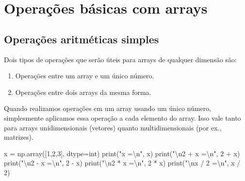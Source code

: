 \documentclass[
  brazilian,
  letterpaper,
  DIV=11,
  numbers=noendperiod]{scrreprt}
\newenvironment{Shaded}{\begin{snugshade}}{\end{snugshade}}
\newcommand{\BuiltInTok}[1]{\textcolor[rgb]{0.00,0.23,0.31}{#1}}
\newcommand{\CharTok}[1]{\textcolor[rgb]{0.13,0.47,0.30}{#1}}
\newcommand{\DecValTok}[1]{\textcolor[rgb]{0.68,0.00,0.00}{#1}}
\newcommand{\NormalTok}[1]{\textcolor[rgb]{0.00,0.23,0.31}{#1}}
\newcommand{\OperatorTok}[1]{\textcolor[rgb]{0.37,0.37,0.37}{#1}}
\newcommand{\StringTok}[1]{\textcolor[rgb]{0.13,0.47,0.30}{#1}}
\begin{document}
\section{Operações básicas com
arrays}\label{operauxe7uxf5es-buxe1sicas-com-arrays}

\subsection{Operações aritméticas
simples}\label{operauxe7uxf5es-aritmuxe9ticas-simples}

Dois tipos de operações que serão úteis para arrays de qualquer dimensão
são:

\begin{enumerate}
\def\labelenumi{\arabic{enumi}.}
\item
  Operações entre um array e um único número.
\item
  Operações entre dois arrays da mesma forma.
\end{enumerate}

Quando realizamos operações em um array usando um único número,
simplesmente aplicamos essa operação a cada elemento do array. Isso vale
tanto para arrays unidimensionais (vetores) quanto multidimensionais
(por ex., matrizes).

\begin{Shaded}
\begin{Highlighting}[]
\NormalTok{x }\OperatorTok{=}\NormalTok{ np.array([}\DecValTok{1}\NormalTok{,}\DecValTok{2}\NormalTok{,}\DecValTok{3}\NormalTok{], dtype}\OperatorTok{=}\BuiltInTok{int}\NormalTok{)}
\BuiltInTok{print}\NormalTok{(}\StringTok{"x =}\CharTok{\textbackslash{}n}\StringTok{"}\NormalTok{, x)}
\BuiltInTok{print}\NormalTok{(}\StringTok{"}\CharTok{\textbackslash{}n}\StringTok{2 + x =}\CharTok{\textbackslash{}n}\StringTok{"}\NormalTok{, }\DecValTok{2} \OperatorTok{+}\NormalTok{ x)}
\BuiltInTok{print}\NormalTok{(}\StringTok{"}\CharTok{\textbackslash{}n}\StringTok{2 {-} x =}\CharTok{\textbackslash{}n}\StringTok{"}\NormalTok{, }\DecValTok{2} \OperatorTok{{-}}\NormalTok{ x)}
\BuiltInTok{print}\NormalTok{(}\StringTok{"}\CharTok{\textbackslash{}n}\StringTok{2 * x =}\CharTok{\textbackslash{}n}\StringTok{"}\NormalTok{, }\DecValTok{2} \OperatorTok{*}\NormalTok{ x)}
\BuiltInTok{print}\NormalTok{(}\StringTok{"}\CharTok{\textbackslash{}n}\StringTok{x / 2 =}\CharTok{\textbackslash{}n}\StringTok{"}\NormalTok{, x }\OperatorTok{/} \DecValTok{2}\NormalTok{)}
\end{Highlighting}
\end{Shaded}
\end{document}
